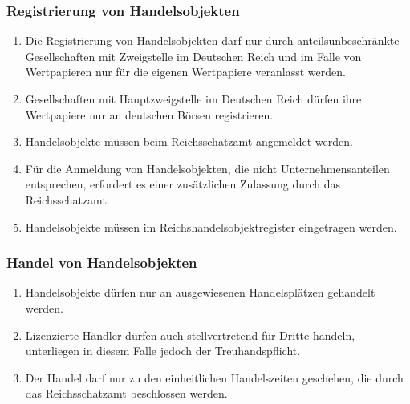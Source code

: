 \documentclass{article}
\begin{document}
\subsubsection{Registrierung von Handelsobjekten}
\begin{enumerate}[(1)]
    \item Die Registrierung von Handelsobjekten darf nur durch anteilsunbeschränkte Gesellschaften mit Zweigstelle im Deutschen Reich und im Falle von Wertpapieren nur für die eigenen Wertpapiere veranlasst werden.
    \item Gesellschaften mit Hauptzweigstelle im Deutschen Reich dürfen ihre Wertpapiere nur an deutschen Börsen registrieren.
    \item Handelsobjekte müssen beim Reichsschatzamt angemeldet werden.
    \item Für die Anmeldung von Handelsobjekten, die nicht Unternehmensanteilen entsprechen, erfordert es einer zusätzlichen Zulassung durch das Reichsschatzamt.
    \item Handelsobjekte müssen im Reichshandelsobjektregister eingetragen werden.
\end{enumerate}

\subsubsection{Handel von Handelsobjekten}
\begin{enumerate}[(1)]
    \item Handelsobjekte dürfen nur an ausgewiesenen Handelsplätzen gehandelt werden.
    \item Lizenzierte Händler dürfen auch stellvertretend für Dritte handeln, unterliegen in diesem Falle jedoch der Treuhandspflicht.
    \item Der Handel darf nur zu den einheitlichen Handelszeiten geschehen, die durch das Reichsschatzamt beschlossen werden.
\end{enumerate}
\end{document}
